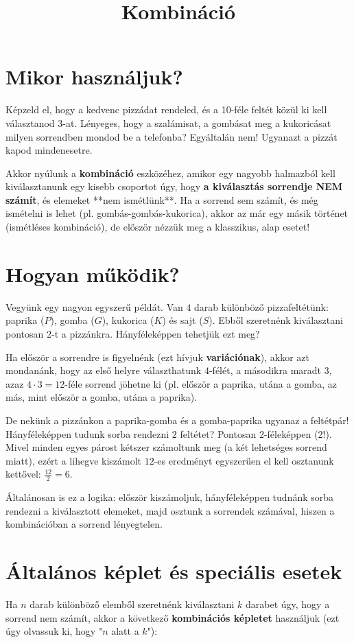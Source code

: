 \documentclass[11pt,a4paper]{article}
\title{Kombináció}
\author{}
\date{}
\begin{document}
\maketitle



\section{Mikor használjuk?}
Képzeld el, hogy a kedvenc pizzádat rendeled, és a 10-féle feltét közül ki kell választanod 3-at. Lényeges, hogy a szalámisat, a gombásat meg a kukoricásat milyen sorrendben mondod be a telefonba? Egyáltalán nem! Ugyanazt a pizzát kapod mindenesetre. 

Akkor nyúlunk a \textbf{kombináció} eszközéhez, amikor egy nagyobb halmazból kell kiválasztanunk egy kisebb csoportot úgy, hogy \textbf{a kiválasztás sorrendje NEM számít}, és elemeket **nem ismétlünk**. Ha a sorrend sem számít, és még ismételni is lehet (pl. gombás-gombás-kukorica), akkor az már egy másik történet (ismétléses kombináció), de először nézzük meg a klasszikus, alap esetet!

\section{Hogyan működik?}
Vegyünk egy nagyon egyszerű példát. Van $4$ darab különböző pizzafeltétünk: paprika ($P$), gomba ($G$), kukorica ($K$) és sajt ($S$). Ebből szeretnénk kiválasztani pontosan $2$-t a pizzánkra. Hányféleképpen tehetjük ezt meg?

Ha először a sorrendre is figyelnénk (ezt hívjuk \textbf{variációnak}), akkor azt mondanánk, hogy az első helyre választhatunk $4$-félét, a másodikra maradt $3$, azaz $4 \cdot 3 = 12$-féle sorrend jöhetne ki (pl. először a paprika, utána a gomba, az más, mint először a gomba, utána a paprika). 

De nekünk a pizzánkon a paprika-gomba és a gomba-paprika ugyanaz a feltétpár! Hányféleképpen tudunk sorba rendezni $2$ feltétet? Pontosan $2$-féleképpen ($2!$). Mivel minden egyes párost kétszer számoltunk meg (a két lehetséges sorrend miatt), ezért a lihegve kiszámolt $12$-es eredményt egyszerűen el kell osztanunk kettővel: $\frac{12}{2} = 6$.

Általánosan is ez a logika: először kiszámoljuk, hányféleképpen tudnánk sorba rendezni a kiválasztott elemeket, majd osztunk a sorrendek számával, hiszen a kombinációban a sorrend lényegtelen.

\section{Általános képlet és speciális esetek}
Ha $n$ darab különböző elemből szeretnénk kiválasztani $k$ darabet úgy, hogy a sorrend nem számít, akkor a következő \textbf{kombinációs képletet} használjuk (ezt úgy olvassuk ki, hogy "$n$ alatt a $k$"):
\end{document}
